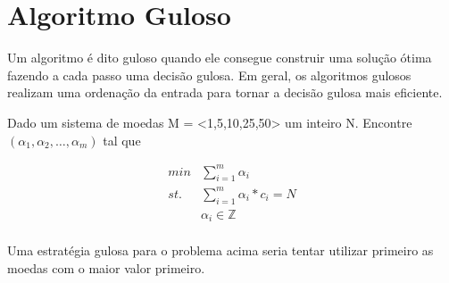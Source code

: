 \chapter[Algoritmo Guloso]{Algoritmo Guloso}

Um algoritmo é dito guloso quando ele consegue construir uma solução ótima fazendo a cada passo uma decisão gulosa. Em geral, os algoritmos gulosos realizam uma ordenação da entrada para tornar a decisão gulosa mais eficiente.


\begin{exemplo}
Dado um sistema de moedas M = <1,5,10,25,50> um inteiro N. Encontre $(\alpha_1, \alpha_2, \ldots, \alpha_m)$ tal que 

\begin{align*}
min &  \sum_{i=1}^{m} \alpha_i\\
st. & \sum_{i = 1}^{m} \alpha_i*c_i = N\\
    & \alpha_i \in \mathbb{Z}\\
\end{align*}

\end{exemplo}

Uma estratégia gulosa para o problema acima seria tentar utilizar primeiro as moedas com o maior valor primeiro.
